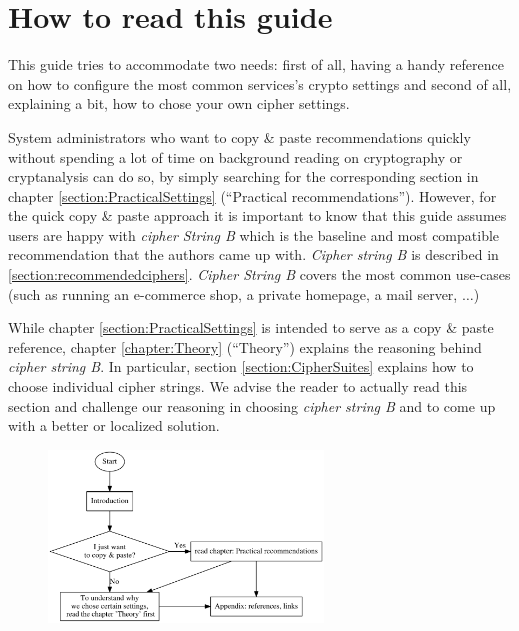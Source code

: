 \section{How to read this guide}

This guide tries to accommodate two needs: first of all, having a handy reference on how to configure the most common services's crypto settings and second of all, explaining a bit, how to chose your own cipher settings.

System administrators who want to copy \& paste recommendations quickly without spending a lot of time on background reading on cryptography or cryptanalysis can do so, by simply searching for the corresponding section in chapter  \ref{section:PracticalSettings} (``Practical recommendations''). However, for the quick copy \& paste approach it is important to know that this guide assumes users are happy with \textit{cipher String B} which is the baseline and most compatible recommendation that the authors came up with. \textit{Cipher string B} is described in \ref{section:recommendedciphers}.
\textit{Cipher String B} covers the most common use-cases (such as running an e-commerce shop, a private homepage, a mail server, $ \ldots $)

While chapter \ref{section:PracticalSettings} is intended to serve as a copy \& paste reference, chapter \ref{chapter:Theory} (``Theory'') explains the reasoning behind \textit{cipher string B}. In particular, section \ref{section:CipherSuites} explains how to choose individual cipher strings. We advise the reader to actually read this section and challenge our reasoning in choosing \textit{cipher string B} and to come up with a better  or localized solution.


\begin{figure}[h]
  \centering
  \includegraphics[width=0.65\textwidth]{img/howtoread}
  \label{fig:howtoread}
\end{figure}


